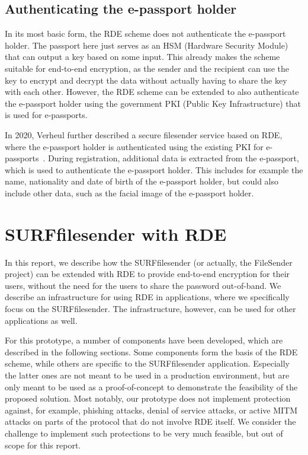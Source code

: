 \subsection{Authenticating the e-passport holder}\label{subsec:authenticating-the-e-passport-holder}
In its most basic form, the RDE scheme does not authenticate the e-passport holder.
The passport here just serves as an HSM (Hardware Security Module) that can output a key based on some input.
This already makes the scheme suitable for end-to-end encryption, as the sender and the recipient can use the key to encrypt and decrypt the data without actually having to share the key with each other.
However, the RDE scheme can be extended to also authenticate the e-passport holder using the government PKI (Public Key Infrastructure) that is used for e-passports.

In 2020, Verheul further described a secure filesender service based on RDE, where the e-passport holder is authenticated using the existing PKI for e-passports~\cite{verheul2020secure}.
During registration, additional data is extracted from the e-passport, which is used to authenticate the e-passport holder.
This includes for example the name, nationality and date of birth of the e-passport holder, but could also include other data, such as the facial image of the e-passport holder.

\section{SURFfilesender with RDE}\label{sec:surf-filesender-with-rde}
In this report, we describe how the SURFfilesender (or actually, the FileSender project) can be extended with RDE to provide end-to-end encryption for their users, without the need for the users to share the password out-of-band.
We describe an infrastructure for using RDE in applications, where we specifically focus on the SURFfilesender.
The infrastructure, however, can be used for other applications as well.

For this prototype, a number of components have been developed, which are described in the following sections.
Some components form the basis of the RDE scheme, while others are specific to the SURFfilesender application.
Especially the latter ones are not meant to be used in a production environment, but are only meant to be used as a proof-of-concept to demonstrate the feasibility of the proposed solution.
Most notably, our prototype does not implement protection against, for example, phishing attacks, denial of service attacks, or active MITM attacks on parts of the protocol that do not involve RDE itself.
We consider the challenge to implement such protections to be very much feasible, but out of scope for this report.

